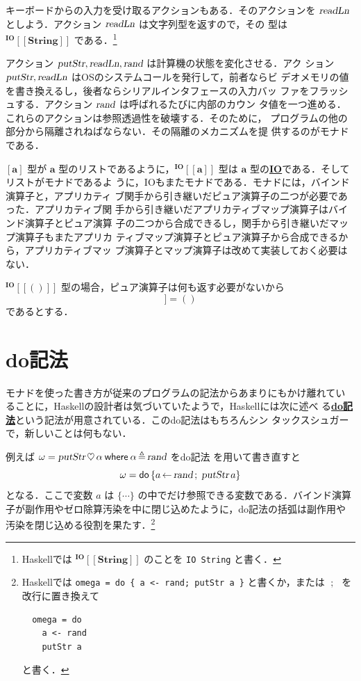 \documentclass[a5paper,twoside,fleqn,draft]{jsbook}
\def\[{[\![}
\def\]{]\!]}
\newcommand{\programminglanguage}[1]{\textsf{#1}}
\newcommand{\haskell}{\programminglanguage{Haskell}}
\newcommand{\keyword}[1]{{\underline{\textbf{#1}}}}
\newcommand{\code}[1]{\texttt{#1}}
\newcommand{\mKeyword}[1]{\mathsf{#1}}
\newcommand{\mDoKeyword}{\mKeyword{do}}
\newcommand{\mWhereKeyword}{\mKeyword{where}}
\DeclareMathOperator{\mDoKW}{\mDoKeyword}
\newcommand{\mAction}[1]{\textsl{#1}}
\DeclareMathOperator{\mReadLn}{\mAction{readLn}}
\DeclareMathOperator{\mPutStr}{\mAction{putStr}}
\DeclareMathOperator{\mRand}{\mAction{rand}}
\DeclareMathOperator{\mBind}{\heartsuit}
\DeclareMathOperator{\mDoEq}{\leftarrow}
\DeclareMathOperator{\mDoNext}{;\;}
\DeclareMathOperator{\mLetEq}{\triangleq}
\newcommand{\mType}[1]{\mathbf{#1}} %
\newcommand{\mA}{\mType{a}}
\newcommand{\mStringType}{\mType{String}}
\newcommand{\mUnitType}{\mType{()}}
\newcommand{\mTypeAssemble}[2]{{}^\mType{#1}\[\mType{#2}\]}
\newcommand{\mIOType}[1]{\mTypeAssemble{IO}{#1}}
\newcommand{\mIOStringType}{\mIOType{\mStringType}}
\newcommand{\mIOUnitType}{\mIOType{\mUnitType}}
\newcommand{\mPureWith}[1]{\[#1\]}
\newcommand{\mTupleWith}[1]{\left(#1\right)} %
\newcommand{\mDo}[1]{\mDoKW\left\{#1\right\}}
\newcommand{\mWhereIsEXP}[2]{\mathbin{\mWhereKeyword}#1\mLetEq#2} %
\begin{document}
キーボードからの入力を受け取るアクションもある．そのアクションを
$\mReadLn$ としよう．アクション $\mReadLn$ は文字列型を返すので，その
型は $\mIOStringType$ である．\footnote{\haskell では $\mIOStringType$
のことを \code{IO String} と書く．}

アクション $\mPutStr,\mReadLn,\mRand$ は計算機の状態を変化させる．アク
ション $\mPutStr,\mReadLn$ はOSのシステムコールを発行して，前者ならビ
デオメモリの値を書き換えるし，後者ならシリアルインタフェースの入力バッ
ファをフラッシュする．アクション $\mRand$ は呼ばれるたびに内部のカウン
タ値を一つ進める．これらのアクションは参照透過性を破壊する．そのために，
プログラムの他の部分から隔離されねばならない．その隔離のメカニズムを提
供するのがモナドである．

$[\mA]$ 型が $\mA $ 型のリストであるように，$\mIOType{a}$
型は $\mA $ 型の\keyword{IO}である．そしてリストがモナドであるよ
うに，IOもまたモナドである．モナドには，バインド演算子と，アプリカティ
ブ関手から引き継いだピュア演算子の二つが必要であった．アプリカティブ関
手から引き継いだアプリカティブマップ演算子はバインド演算子とピュア演算
子の二つから合成できるし，関手から引き継いだマップ演算子もまたアプリカ
ティブマップ演算子とピュア演算子から合成できるから，アプリカティブマッ
プ演算子とマップ演算子は改めて実装しておく必要はない．

$\mIOUnitType$ 型の場合，ピュア演算子は何も返す必要がないから
\begin{equation}
\mPureWith{\_}=()
\end{equation}
であるとする．





\section{do記法}

モナドを使った書き方が従来のプログラムの記法からあまりにもかけ離れてい
ることに，\haskell の設計者は気づいていたようで，\haskell には次に述べ
る\keyword{do記法}という記法が用意されている．このdo記法はもちろんシン
タックスシュガーで，新しいことは何もない．

例えば $\omega=\mPutStr\mBind\alpha\mWhereIsEXP{\alpha}{\mRand}$ をdo記法
を用いて書き直すと
\begin{equation}
\label{eq:do-print-random}
\omega=\mDo{a\mDoEq\mRand\mDoNext\mPutStr a}
\end{equation}
となる．ここで変数 $a$ は $\{\dotsb\}$ の中でだけ参照できる変数である．バインド演算子が副作用やゼロ除算汚染を中に閉じ込めたように，do記法の括弧は副作用や汚染を閉じ込める役割を果たす．\footnote{\haskell では \code{omega = do \{ a <- rand; putStr
a \}} と書くか，または $\mDoNext$ を改行に置き換えて
\begin{verbatim}
  omega = do
    a <- rand
    putStr a
\end{verbatim}
と書く．}
\end{document}
